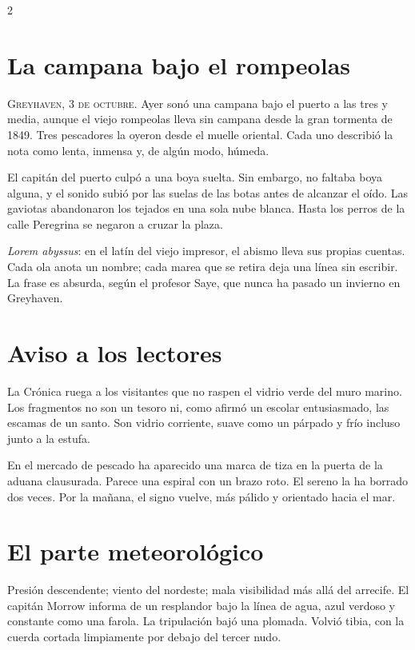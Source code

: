\begin{multicols}{2}
\section*{La campana bajo el rompeolas}
\textsc{Greyhaven, 3 de octubre.} Ayer sonó una campana bajo el puerto a las
tres y media, aunque el viejo rompeolas lleva sin campana desde la gran
tormenta de 1849. Tres pescadores la oyeron desde el muelle oriental. Cada
uno describió la nota como lenta, inmensa y, de algún modo, húmeda.

El capitán del puerto culpó a una boya suelta. Sin embargo, no faltaba boya
alguna, y el sonido subió por las suelas de las botas antes de alcanzar el
oído. Las gaviotas abandonaron los tejados en una sola nube blanca. Hasta
los perros de la calle Peregrina se negaron a cruzar la plaza.

\textit{Lorem abyssus}: en el latín del viejo impresor, el abismo lleva sus
propias cuentas. Cada ola anota un nombre; cada marea que se retira deja una
línea sin escribir. La frase es absurda, según el profesor Saye, que nunca
ha pasado un invierno en Greyhaven.

\section*{Aviso a los lectores}
La Crónica ruega a los visitantes que no raspen el vidrio verde del muro
marino. Los fragmentos no son un tesoro ni, como afirmó un escolar
entusiasmado, las escamas de un santo. Son vidrio corriente, suave como un
párpado y frío incluso junto a la estufa.

En el mercado de pescado ha aparecido una marca de tiza en la puerta de la
aduana clausurada. Parece una espiral con un brazo roto. El sereno la ha
borrado dos veces. Por la mañana, el signo vuelve, más pálido y orientado
hacia el mar.

\columnbreak
\section*{El parte meteorológico}
Presión descendente; viento del nordeste; mala visibilidad más allá del
arrecife. El capitán Morrow informa de un resplandor bajo la línea de agua,
azul verdoso y constante como una farola. La tripulación bajó una plomada.
Volvió tibia, con la cuerda cortada limpiamente por debajo del tercer nudo.


\end{multicols}
